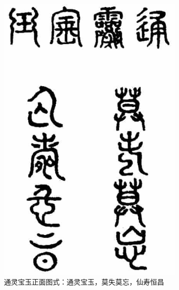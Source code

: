 \begin{figure}[h]
     \centering
     \caption{宝玉的通灵宝玉}
     \begin{subfigure}[b]{0.45\textwidth}
         \centering
         \includegraphics[width=\textwidth]{images/yu-1.JPG}
         \caption*{通灵宝玉正面图式：通灵宝玉，莫失莫忘，仙寿恒昌}
     \end{subfigure}
     \hfill
     \begin{subfigure}[b]{0.45\textwidth}
         \centering

\end{subfigure}
\end{figure}
